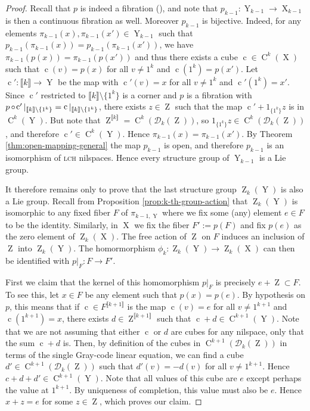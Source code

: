 \documentclass[a4paper,12pt,reqno]{amsart}
\theoremstyle{definition}
\def\to{\rightarrow}
\newcommand*{\db}[1]{\llbracket #1\rrbracket}
\newcommand{\mc}{\mathcal}
\DeclareMathOperator{\ab}{Z}
\DeclareMathOperator{\q}{c}
\DeclareMathOperator{\ns}{X}
\DeclareMathOperator{\nss}{Y}
\DeclareMathOperator{\co}{\circ\hspace{-0.02 cm}}
\DeclareMathOperator{\cu}{C}
\begin{document}
\begin{proof}
Recall that $p$ is indeed a fibration (\cite[Proposition A.18]{CGSS-p-hom}), and note that $p_{k-1}:\nss_{k-1}\to \ns_{k-1}$ is then a continuous fibration as well. Moreover $p_{k-1}$ is bijective. Indeed, for any elements $\pi_{k-1}(x),\pi_{k-1}(x')\in\nss_{k-1}$ such that $p_{k-1}(\pi_{k-1}(x))=p_{k-1}(\pi_{k-1}(x'))$, we have $\pi_{k-1}(p(x))=\pi_{k-1}(p(x'))$ and thus there exists a cube $\q\in \cu^k(\ns)$ such that $\q(v)=p(x)$ for all $v\not=1^k$ and $\q(1^k)=p(x')$. Let $\q':\db{k}\to\nss$ be the map with $\q'(v)=x$ for all $v\not=1^k$ and $\q'(1^k)=x'$. Since $\q'$ restricted to $\db{k}\setminus\{1^k\}$ is a corner and $p$ is a fibration with $p\co \q'|_{\db{k}\setminus\{1^k\}}=\q|_{\db{k}\setminus\{1^k\}}$, there exists $z\in \ab$ such that the map $\q'+1_{\{1^k\}}z$ is in $\cu^k(\nss)$. But note that $\ab^{\db{k}} = \cu^k(\mc{D}_k(\ab))$, so $1_{\{1^k\}}z\in \cu^k(\mc{D}_k(\ab))$, and therefore $\q'\in \cu^k(\nss)$. Hence $\pi_{k-1}(x)=\pi_{k-1}(x')$. By Theorem \ref{thm:open-mapping-general} the map $p_{k-1}$ is open, and therefore $p_{k-1}$ is an isomorphism of \textsc{lch} nilspaces. Hence every structure group of $\nss_{k-1}$ is a Lie group.

It therefore remains only to prove that the last structure group $\ab_k(\nss)$ is also a Lie group. Recall from Proposition \ref{prop:k-th-group-action} that $\ab_k(\nss)$ is isomorphic to any fixed fiber $F$ of $\pi_{k-1,\nss}$ where we fix some (any) element $e\in F$ to be the identity. Similarly, in $\ns$ we fix the fiber $F':=p(F)$ and fix $p(e)$ as the zero element of $\ab_k(\ns)$. The free action of $\ab$ on $F$ induces an inclusion of $\ab$ into $\ab_k(\nss)$. The homormorphism $\phi_k:\ab_k(\nss)\to\ab_k(\ns)$ can then be identified with $p|_F:F\to F'$. 

First we claim that the kernel of this homomorphism  $p|_F$ is precisely $e+\ab\subset F$. To see this, let $x\in F$ be any element such that $p(x)=p(e)$. By hypothesis on $p$, this means that if $\q\in F^{\db{k+1}}$ is the map $\q(v)=e$ for all $v\not=1^{k+1}$ and $\q(1^{k+1})=x$, there exists $d\in \ab^{\db{k+1}}$ such that $\q+d\in \cu^{k+1}(\nss)$. Note that we are not assuming that either $\q$ or $d$ are cubes for any nilspace, only that the sum $\q+d$ is. Then, by definition of the cubes in $\cu^{k+1}(\mc{D}_k(\ab))$ in terms of the single Gray-code linear equation, we can find a cube $d'\in \cu^{k+1}(\mc{D}_k(\ab))$ such that $d'(v)=-d(v)$ for all $v\not=1^{k+1}$. Hence $c+d+d'\in \cu^{k+1}(\nss)$. Note that all values of this cube are $e$ except perhaps the value at  $1^{k+1}$. By uniqueness of completion, this value must also be $e$. Hence $x+z=e$ for some $z\in \ab$,  which proves our claim.


\end{proof}
\end{document}

